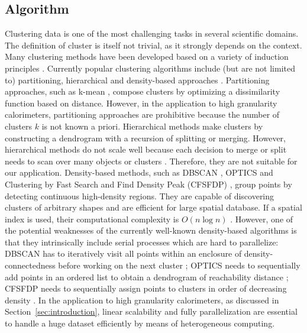\subsection{Algorithm}
\label{sec:algorithm}
Clustering data is one of the most challenging tasks in several scientific domains. The definition of cluster is itself not trivial, as it strongly depends on the context. Many clustering methods have been developed based on a variety of induction principles \cite{maimon2005data}. Currently popular clustering algorithms include (but are not limited to) partitioning, hierarchical and density-based approaches \cite{maimon2005data,han2011data}. Partitioning approaches, such as k-mean \cite{lloyd1982least}, compose clusters by optimizing a dissimilarity function based on distance. However, in the application to high granularity calorimeters, partitioning approaches are prohibitive because the number of clusters $k$ is not known a priori. Hierarchical methods make clusters by constructing a dendrogram with a recursion of splitting or merging. However, hierarchical methods do not scale well because each decision to merge or split needs to scan over many objects or clusters \cite{han2011data}. Therefore, they are not suitable for our application. Density-based methods, such as DBSCAN \cite{Ester:1996:DAD:3001460.3001507}, OPTICS \cite{Ankerst:1999:OOP:304182.304187} and Clustering by Fast Search and Find Density Peak (CFSFDP) \cite{rodriguez2014clustering}, group points by detecting continuous high-density regions. They are capable of discovering clusters of arbitrary shapes and are efficient for large spatial database. If a spatial index is used, their computational complexity is $O(n\log n)$ \cite{han2011data}. However, one of the potential weaknesses of the currently well-known density-based algorithms is that they intrinsically include serial processes which are hard to parallelize: DBSCAN has to iteratively visit all points within an enclosure of density-connectedness before working on the next cluster \cite{Ester:1996:DAD:3001460.3001507}; OPTICS needs to sequentially add points in an ordered list to obtain a dendrogram of reachability distance \cite{Ankerst:1999:OOP:304182.304187}; CFSFDP needs to sequentially assign points to clusters in order of decreasing density \cite{rodriguez2014clustering}. In the application to high granularity calorimeters, as discussed in Section~\ref{sec:introduction}, linear scalability and fully parallelization are essential to handle a huge dataset efficiently by means of heterogeneous computing.


